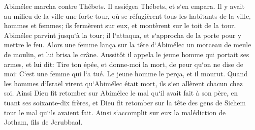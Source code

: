 \verse Abimélec marcha contre Thébets. Il assiégea Thébets, et s`en empara. 
\verse Il y avait au milieu de la ville une forte tour, où se réfugièrent tous les habitants de la ville, hommes et femmes; ils fermèrent sur eux, et montèrent sur le toit de la tour. 
\verse Abimélec parvint jusqu`à la tour; il l`attaqua, et s`approcha de la porte pour y mettre le feu. 
\verse Alors une femme lança sur la tête d`Abimélec un morceau de meule de moulin, et lui brisa le crâne. 
\verse Aussitôt il appela le jeune homme qui portait ses armes, et lui dit: Tire ton épée, et donne-moi la mort, de peur qu`on ne dise de moi: C`est une femme qui l`a tué. Le jeune homme le perça, et il mourut. 
\verse Quand les hommes d`Israël virent qu`Abimélec était mort, ils s`en allèrent chacun chez soi. 
\verse Ainsi Dieu fit retomber sur Abimélec le mal qu`il avait fait à son père, en tuant ses soixante-dix frères, 
\verse et Dieu fit retomber sur la tête des gens de Sichem tout le mal qu`ils avaient fait. Ainsi s`accomplit sur eux la malédiction de Jotham, fils de Jerubbaal. 

